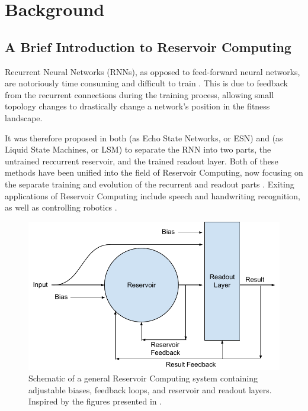 \chapter{Background}
\label{chapter:background}

\section{A Brief Introduction to Reservoir Computing}

Recurrent Neural Networks (RNNs), as opposed to feed-forward neural networks,
are notoriously time consuming and difficult to train \cite{Schrauwen2007}.
This is due to feedback from the recurrent connections during the training process,
allowing small topology changes to drastically change a network's position in the fitness landscape.

It was therefore proposed in both \cite{jaeger2002adaptive} (as Echo State Networks, or ESN)
and \cite{natschlager2002liquid} (as Liquid State Machines, or LSM) to separate the RNN into two parts,
the untrained reccurrent reservoir, and the trained readout layer.
Both of these methods have been unified into the field of Reservoir Computing,
now focusing on the separate training and evolution of the recurrent and readout parts \cite{lukovsevivcius2012reservoir}.
Exiting applications of Reservoir Computing include speech and handwriting recognition,
as well as controlling robotics \cite{lukovsevivcius2012reservoir}.

\begin{figure}[ht]
    \caption{
        Schematic of a general Reservoir Computing system containing adjustable biases, feedback loops, and reservoir and readout layers.
        Inspired by the figures presented in \cite{Schrauwen2007}.
    }
    \label{fig:rc-schema}
    \includegraphics[width=\columnwidth]{background/reservoir_computing_schema.pdf}
\end{figure}

